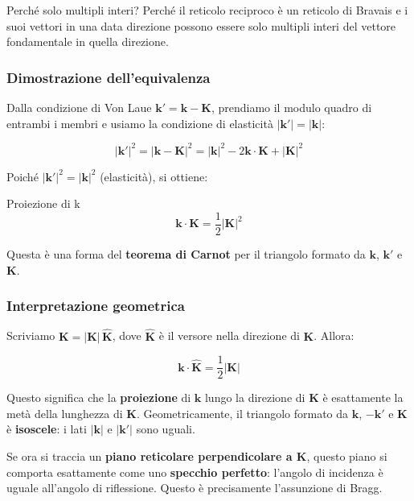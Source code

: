 Perché solo multipli interi? Perché il reticolo reciproco è un reticolo di Bravais e i suoi vettori in una data direzione possono essere solo multipli interi del vettore fondamentale in quella direzione.

\subsubsection{Dimostrazione dell'equivalenza}

Dalla condizione di Von Laue $\mathbf{k}' = \mathbf{k} - \mathbf{K}$, prendiamo il modulo quadro di entrambi i membri e usiamo la condizione di elasticità $|\mathbf{k}'| = |\mathbf{k}|$:

$$|\mathbf{k}'|^2 = |\mathbf{k} - \mathbf{K}|^2 = |\mathbf{k}|^2 - 2\mathbf{k}\cdot\mathbf{K} + |\mathbf{K}|^2$$

Poiché $|\mathbf{k}'|^2 = |\mathbf{k}|^2$ (elasticità), si ottiene:

\begin{equazione}{Proiezione di k}
\begin{equation}
\mathbf{k} \cdot \mathbf{K} = \frac{1}{2}|\mathbf{K}|^2
\end{equation}
\end{equazione}

Questa è una forma del \textbf{teorema di Carnot} per il triangolo formato da $\mathbf{k}$, $\mathbf{k}'$ e $\mathbf{K}$.

\subsubsection{Interpretazione geometrica}

Scriviamo $\mathbf{K} = |\mathbf{K}|\,\hat{\mathbf{K}}$, dove $\hat{\mathbf{K}}$ è il versore nella direzione di $\mathbf{K}$. Allora:

$$\mathbf{k} \cdot \hat{\mathbf{K}} = \frac{1}{2}|\mathbf{K}|$$

Questo significa che la \textbf{proiezione} di $\mathbf{k}$ lungo la direzione di $\mathbf{K}$ è esattamente la metà della lunghezza di $\mathbf{K}$. Geometricamente, il triangolo formato da $\mathbf{k}$, $-\mathbf{k}'$ e $\mathbf{K}$ è \textbf{isoscele}: i lati $|\mathbf{k}|$ e $|\mathbf{k}'|$ sono uguali.

Se ora si traccia un \textbf{piano reticolare perpendicolare a $\mathbf{K}$}, questo piano si comporta esattamente come uno \textbf{specchio perfetto}: l'angolo di incidenza è uguale all'angolo di riflessione. Questo è precisamente l'assunzione di Bragg.

